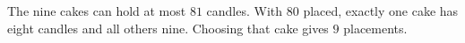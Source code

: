 The nine cakes can hold at most $81$ candles. With $80$ placed, exactly one cake has eight candles and all others nine. Choosing that cake gives $\boxed9$ placements.
